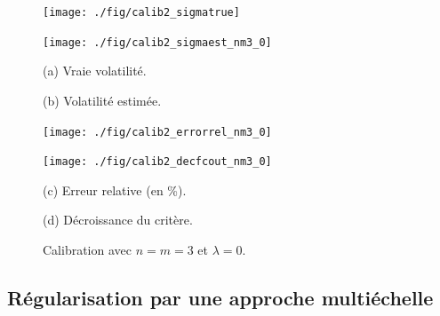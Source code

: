 \begin{figure}[!htbp]

\begin{center}
\begin{minipage}{5.8cm}
\centerline{\texttt{[image: ./fig/calib2\_sigmatrue]}
} 
\end{minipage}
\hspace*{0.1cm}
\begin{minipage}{5.8cm}
\centerline{\texttt{[image: ./fig/calib2\_sigmaest\_nm3\_0]}
}
\end{minipage}
\end{center}

\begin{center}
\begin{minipage}{5.8cm}
(a) Vraie volatilit\'e.
\end{minipage}
\hspace*{0.1cm}
\begin{minipage}{5.8cm}
(b) Volatilit\'e estim\'ee.
\end{minipage}
\end{center}

\medskip

\begin{center}
\begin{minipage}{5.8cm}
\centerline{\texttt{[image: ./fig/calib2\_errorrel\_nm3\_0]}
}
\end{minipage}
\hspace*{0.1cm}
\begin{minipage}{5.8cm}
\centerline{\texttt{[image: ./fig/calib2\_decfcout\_nm3\_0]}
}
\end{minipage}
\end{center}

\begin{center}
\begin{minipage}{5.8cm}
(c) Erreur relative (en \%).
\end{minipage}
\hspace*{0.1cm}
\begin{minipage}{5.8cm}
(d) D\'ecroissance du crit\`ere.
\end{minipage}
\end{center}

\caption{Calibration avec $n = m = 3$ et $\lambda = 0$.}
\label{FIG:CALIB2_NM3_0}
\end{figure}

\pagebreak

\subsection{R\'egularisation par une approche multi\'echelle}
\label{SSEC:MULTIECHELLE}

